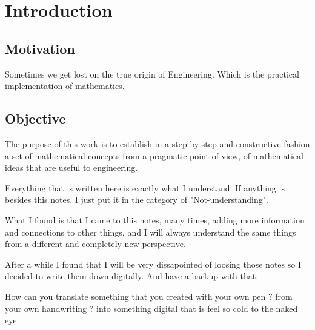 \documentclass[11pt,fleqn]{book} %
\begin{document}
\pagestyle{fancy} %



\chapter{Introduction}

\section{Motivation}


Sometimes we get lost on the true origin of Engineering.
Which is the practical implementation of mathematics.



\section{Objective}

The purpose of this work is to establish in a step by step and constructive fashion a set of mathematical concepts from a pragmatic point of view, of mathematical ideas that are useful to engineering.

Everything that is written here is exactly what I understand. If anything is besides this notes, I just put it in the category of "Not-understanding".  

What I found is that I came to this notes, many times, adding more information and connections to other things, and I will always understand the same things from a different and completely new perspective.

After a while I found that I will be very dissapointed of loosing those notes so I decided to write them down digitally. And have a backup with that.

How can you translate something that you created with your own pen ?  from your own handwriting ?  into something digital that is feel so cold to the naked eye.
\end{document}

